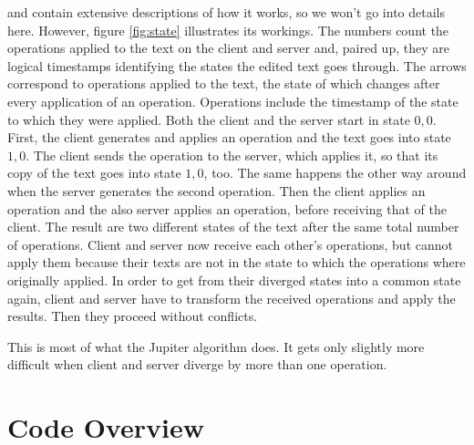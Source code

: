 \documentclass[a4paper,draft,12pt,oneside,article,table]{memoir}
\newcommand*{\state}[1]{\ensuremath{#1}}
\begin{document}
\cite{Jupiter} and \cite{UnderstandOT} contain extensive descriptions of
how it works, so we won't go into details here. However, figure
\ref{fig:state} illustrates its workings. The numbers count the
operations applied to the text on the client and server and, paired up,
they are logical timestamps identifying the states the edited text goes
through. The arrows correspond to operations applied to the text, the
state of which changes after every application of an operation.
Operations include the timestamp of the state to which they were
applied. Both the client and the server start in state \state{0,0}.
First, the client generates and applies an operation and the text goes
into state \state{1,0}. The client sends the operation to the server,
which applies it, so that its copy of the text goes into state
\state{1,0}, too. The same happens the other way around when the server
generates the second operation. Then the client applies an operation and
the also server applies an operation, before receiving that of the
client. The result are two different states of the text after the same
total number of operations. Client and server now receive each other's
operations, but cannot apply them because their texts are not in the
state to which the operations where originally applied. In order to get
from their diverged states into a common state again, client and server
have to transform the received operations and apply the results. Then
they proceed without conflicts.

This is most of what the Jupiter algorithm does. It gets only slightly
more difficult when client and server diverge by more than one
operation.


\chapter{Code Overview}
\end{document}
